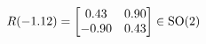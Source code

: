 \documentclass[preview]{standalone}
\begin{document}
\begin{align*}
\special{dvisvgm:raw <g id='unique000'>}R(-1.12) = \begin{bmatrix} 0.43 & 0.90 \\ -0.90 & 0.43 \end{bmatrix} \in \text{SO}(2)\special{dvisvgm:raw </g>}
\end{align*}
\end{document}
